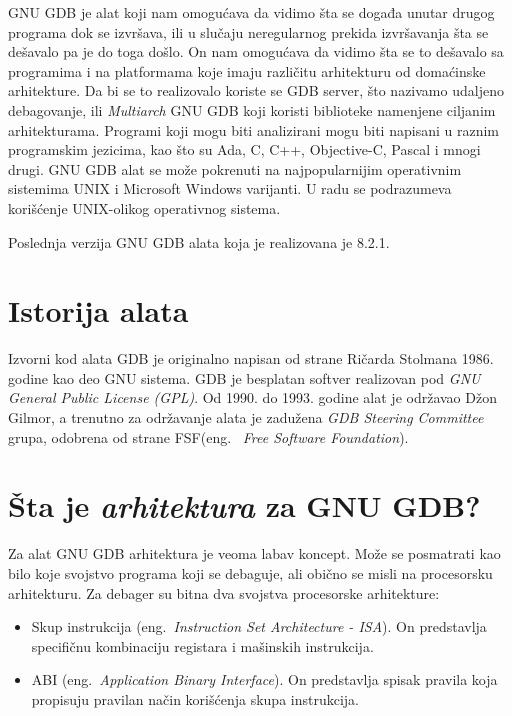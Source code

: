 \documentclass[12pt,oneside]{memoir}
\begin{document}
GNU GDB je alat koji nam omogućava da vidimo šta se događa unutar drugog programa dok se izvršava, ili u slučaju neregularnog prekida izvršavanja šta se dešavalo pa je do toga došlo. On nam omogućava da vidimo šta se to dešavalo sa programima i na platformama koje imaju različitu arhitekturu od domaćinske arhitekture. Da bi se to realizovalo koriste se GDB server, što nazivamo udaljeno debagovanje, ili \emph{Multiarch} GNU GDB koji koristi biblioteke namenjene ciljanim arhitekturama. Programi koji mogu biti analizirani mogu biti napisani u raznim programskim jezicima, kao što su Ada, C, C++, Objective-C, Pascal i mnogi drugi. GNU GDB alat se može pokrenuti na najpopularnijim operativnim sistemima UNIX i Microsoft Windows varijanti. U radu se podrazumeva korišćenje UNIX-olikog operativnog sistema.

Poslednja verzija GNU GDB alata koja je realizovana je 8.2.1.

\section{Istorija alata}

Izvorni kod alata GDB je originalno napisan od strane Ričarda Stolmana 1986. godine kao deo GNU sistema. GDB je besplatan softver realizovan pod \emph{GNU General Public License (GPL)}. Od 1990. do 1993. godine alat je održavao Džon Gilmor, a trenutno za održavanje alata je zadužena \emph{GDB Steering Committee} grupa, odobrena od strane FSF(eng.~\emph{ Free Software Foundation}).

\section{Šta je \emph{arhitektura} za GNU GDB?}

Za alat GNU GDB arhitektura je veoma labav koncept. Može se posmatrati kao bilo koje svojstvo programa koji se debaguje, ali obično se misli na procesorsku arhitekturu. Za debager su bitna dva svojstva procesorske arhitekture:

\begin{itemize}
	\item Skup instrukcija (eng.~\emph{Instruction Set Architecture - ISA}). On predstavlja specifičnu kombinaciju registara i mašinskih instrukcija.
	\item ABI (eng.~\emph{Application Binary Interface}). On predstavlja spisak pravila koja propisuju pravilan način korišćenja skupa instrukcija.
\end{itemize}
\end{document}
